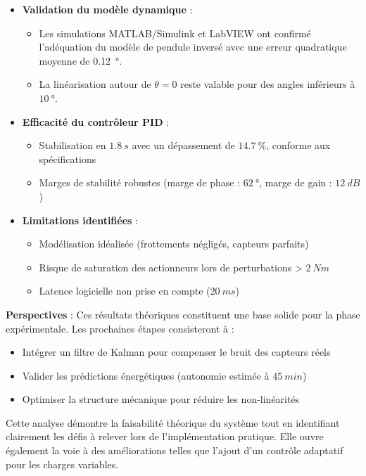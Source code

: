 \documentclass{report}
\begin{document}
\begin{itemize}
    \item \textbf{Validation du modèle dynamique} :  
    \begin{itemize}
        \item Les simulations MATLAB/Simulink et LabVIEW ont confirmé l'adéquation du modèle de pendule inversé avec une erreur quadratique moyenne de \SI{0.12}{\degree}.
        \item La linéarisation autour de $\theta = 0$ reste valable pour des angles inférieurs à $\SI{10}{\degree}$.
    \end{itemize}
    
    \item \textbf{Efficacité du contrôleur PID} :
    \begin{itemize}
        \item Stabilisation en $\SI{1.8}{s}$ avec un dépassement de $\SI{14.7}{\percent}$, conforme aux spécifications
        \item Marges de stabilité robustes (marge de phase : $\SI{62}{\degree}$, marge de gain : $\SI{12}{dB}$)
    \end{itemize}
    
    \item \textbf{Limitations identifiées} :
    \begin{itemize}
        \item Modélisation idéalisée (frottements négligés, capteurs parfaits)
        \item Risque de saturation des actionneurs lors de perturbations > $\SI{2}{Nm}$
        \item Latence logicielle non prise en compte ($\SI{20}{ms}$)
    \end{itemize}
\end{itemize}

\textbf{Perspectives} :  
Ces résultats théoriques constituent une base solide pour la phase expérimentale. Les prochaines étapes consisteront à :
\begin{itemize}
    \item Intégrer un filtre de Kalman pour compenser le bruit des capteurs réels
    \item Valider les prédictions énergétiques (autonomie estimée à $\SI{45}{min}$)
    \item Optimiser la structure mécanique pour réduire les non-linéarités
\end{itemize}

Cette analyse démontre la faisabilité théorique du système tout en identifiant clairement les défis à relever lors de l'implémentation pratique. Elle ouvre également la voie à des améliorations telles que l'ajout d'un contrôle adaptatif pour les charges variables.
\end{document}

